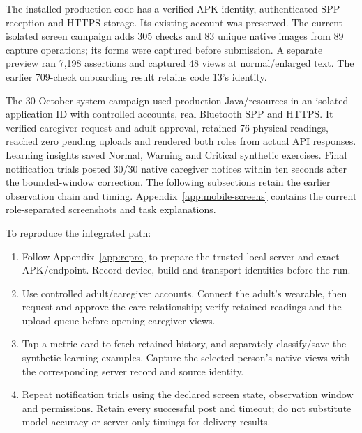 The installed production code \CurrentVersionCode{} has a verified APK identity, authenticated SPP reception and HTTPS storage. Its existing account was preserved. The current isolated screen campaign adds 305 checks and 83 unique native images from 89 capture operations; its forms were captured before submission. A separate preview ran 7,198 assertions and captured 48 views at normal/enlarged text. The earlier 709-check onboarding result retains code 13's identity.

The 30 October system campaign used production Java/resources in an isolated application ID with controlled accounts, real Bluetooth SPP and HTTPS. It verified caregiver request and adult approval, retained 76 physical readings, reached zero pending uploads and rendered both roles from actual API responses. Learning insights saved Normal, Warning and Critical synthetic exercises. Final notification trials posted 30/30 native caregiver notices within ten seconds after the bounded-window correction. The following subsections retain the earlier observation chain and timing. Appendix~\ref{app:mobile-screens} contains the current role-separated screenshots and task explanations.\cite{systemrun}

To reproduce the integrated path:
\begin{enumerate}
\item Follow Appendix~\ref{app:repro} to prepare the trusted local server and exact APK/endpoint. Record device, build and transport identities before the run.
\item Use controlled adult/caregiver accounts. Connect the adult's wearable, then request and approve the care relationship; verify retained readings and the upload queue before opening caregiver views.
\item Tap a metric card to fetch retained history, and separately classify/save the synthetic learning examples. Capture the selected person's native views with the corresponding server record and source identity.
\item Repeat notification trials using the declared screen state, observation window and permissions. Retain every successful post and timeout; do not substitute model accuracy or server-only timings for delivery results.
\end{enumerate}

